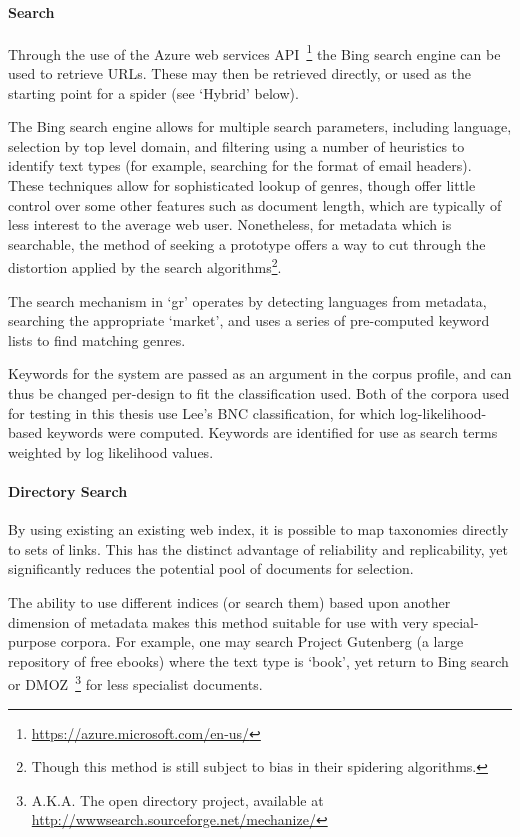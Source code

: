 \paragraph{Search}
Through the use of the Azure web services API~\footnote{\url{https://azure.microsoft.com/en-us/}} the Bing search engine can be used to retrieve URLs.  These may then be retrieved directly, or used as the starting point for a spider (see `Hybrid' below).

The Bing search engine allows for multiple search parameters, including language, selection by top level domain, and filtering using a number of heuristics to identify text types (for example, searching for the format of email headers).  These techniques allow for sophisticated lookup of genres, though offer little control over some other features such as document length, which are typically of less interest to the average web user.  Nonetheless, for metadata which is searchable, the method of seeking a prototype offers a way to cut through the distortion applied by the search algorithms\footnote{Though this method is still subject to bias in their spidering algorithms.}.

The search mechanism in `gr' operates by detecting languages from metadata, searching the appropriate `market', and uses a series of pre-computed keyword lists to find matching genres.

Keywords for the system are passed as an argument in the corpus profile, and can thus be changed per-design to fit the classification used.  Both of the corpora used for testing in this thesis use Lee's BNC classification, for which log-likelihood-based keywords were computed.  Keywords are identified for use as search terms weighted by log likelihood values.


\paragraph{Directory Search}
By using existing an existing web index, it is possible to map taxonomies directly to sets of links.  This has the distinct advantage of reliability and replicability, yet significantly reduces the potential pool of documents for selection.

The ability to use different indices (or search them) based upon another dimension of metadata makes this method suitable for use with very special-purpose corpora.  For example, one may search Project Gutenberg (a large repository of free ebooks) where the text type is `book', yet return to Bing search or DMOZ~\footnote{A.K.A. The open directory project, available at \url{http://wwwsearch.sourceforge.net/mechanize/}} for less specialist documents.

